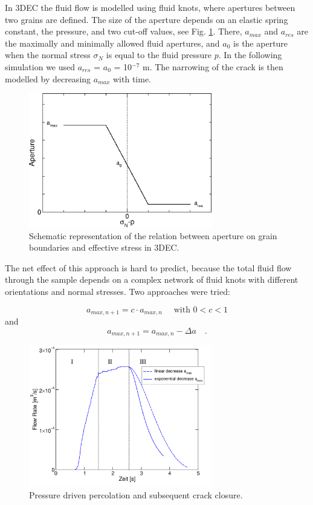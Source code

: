 In 3DEC the fluid flow is modelled using fluid knots, where apertures between two grains are defined. The size of the aperture depends on an elastic spring constant, the pressure, and two cut-off values, see Fig. \ref{fig:ME3-dem-apert}. There, $a_{max}$ and $a_{res}$ are the maximally and minimally allowed fluid apertures, and $a_0$ is the aperture when the normal stress $\sigma_N$ is equal to the fluid pressure $p$. In the following simulation we used $a_{res}$ = $a_0$ = 10$^{-7}$ m. The narrowing of the crack is then modelled by decreasing $a_{max}$ with time. 

\begin{figure}[!ht]
\centering
\includegraphics[width=8cm]{figures/mex3-aperture.png}
\caption{Schematic representation of the relation between aperture on grain boundaries and effective stress in 3DEC.}
\label{fig:ME3-dem-apert}
\end{figure}

The net effect of this approach is hard to predict, because the total fluid flow through the sample depends on a complex network of fluid knots with different orientations and normal stresses. Two approaches were tried: 

\begin{equation}
a_{max,n+1} = c \cdot a_{max,n} \quad \mbox{ with } 0<c<1
\end{equation}
and
\begin{equation}
a_{max,n+1} = a_{max,n} - \Delta a \quad .
\end{equation}

\begin{figure}[!ht]
\centering
\includegraphics[width=8cm]{figures/mex3-flowrate-run3beide.png}
\caption{Pressure driven percolation and subsequent crack closure.}
\label{fig:ME3-flowrate-beide}
\end{figure}


